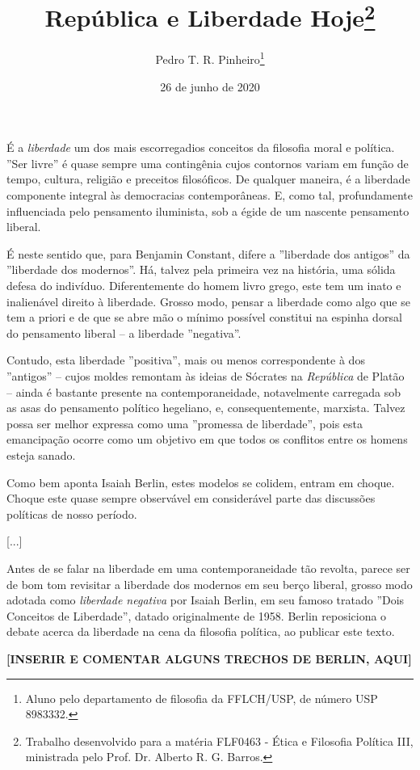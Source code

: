 \documentclass[12pt,a4paper]{article}
\author{Pedro T. R. Pinheiro\footnote{Aluno pelo departamento de filosofia 
da FFLCH/USP, de número USP 8983332. }}
\title{República e Liberdade Hoje\footnote{
	Trabalho desenvolvido para a matéria FLF0463 - Ética e Filosofia 
	Política III, ministrada pelo Prof. Dr. Alberto R. G. Barros. }}
\date{26 de junho de 2020}
\begin{document}
	\maketitle
	
	\onehalfspacing
	\setlength{\parskip}{0.5cm}

	É a \textit{liberdade} um dos mais escorregadios conceitos da 
	filosofia moral e política. ”Ser livre” é quase sempre uma 
	contingênia cujos contornos variam em função de tempo, cultura, 
	religião e preceitos filosóficos. De qualquer maneira, é a 
	liberdade componente integral às democracias contemporâneas. E, 
	como tal, profundamente influenciada pelo pensamento iluminista, 
	sob a égide de um nascente pensamento liberal. 

	É neste sentido que, para Benjamin Constant, difere a ”liberdade 
	dos antigos” da ”liberdade dos modernos”. Há, talvez pela primeira 
	vez na história, uma sólida defesa do indivíduo. Diferentemente do 
	homem livro grego, este tem um inato e inalienável direito à 
	liberdade. Grosso modo, pensar a liberdade como algo que se tem 
	a priori e de que se abre mão o mínimo possível constitui na 
	espinha dorsal do pensamento liberal -- a liberdade ”negativa”. 

	Contudo, esta liberdade ”positiva”, mais ou menos correspondente 
	à dos ”antigos” -- cujos moldes remontam às ideias de Sócrates na 
	\textit{República} de Platão -- ainda é bastante presente na 
	contemporaneidade, notavelmente carregada sob as asas do pensamento 
	político hegeliano, e, consequentemente, marxista. Talvez possa ser 
	melhor expressa como uma ”promessa de liberdade”, pois esta 
	emancipação ocorre como um objetivo em que todos os conflitos entre 
	os homens esteja sanado. 

	Como bem aponta Isaiah Berlin, estes modelos se colidem, entram em 
	choque. Choque este quase sempre observável em considerável parte 
	das discussões políticas de nosso período. 

	[...]
	


	Antes de se falar na liberdade em uma contemporaneidade tão revolta, 
	parece ser de bom tom revisitar a liberdade dos modernos em seu berço 
	liberal, grosso modo adotada como \textit{liberdade negativa} por 
	Isaiah Berlin, em seu famoso tratado ”Dois Conceitos de Liberdade”, 
	datado originalmente de 1958. Berlin reposiciona o debate acerca da 
	liberdade na cena da filosofia política, ao publicar este texto. 

	\textbf{[INSERIR E COMENTAR ALGUNS TRECHOS DE BERLIN, AQUI]}
\end{document}
